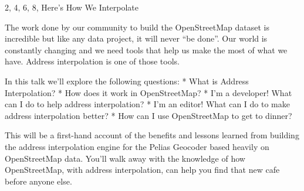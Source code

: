 %
{2, 4, 6, 8, Here's How We Interpolate}%
{}%
{%
  The work done by our community to build the OpenStreetMap dataset is incredible but like any data
  project, it will never “be done”. Our world is constantly changing and we need tools that help us
  make the most of what we have. Address interpolation is one of those tools.

  In this talk we’ll explore the following questions:
  * What is Address Interpolation?
  * How does it work in OpenStreetMap?
  * I’m a developer! What can I do to help address interpolation?
  * I’m an editor! What can I do to make address interpolation better?
  * How can I use OpenStreetMap to get to dinner?
  
  This will be a first-hand account of the benefits and lessons learned from building the address
  interpolation engine for the Pelias Geocoder based heavily on OpenStreetMap data. You’ll walk away
  with the knowledge of how OpenStreetMap, with address interpolation, can help you find that new
  cafe before anyone else.
%
}

